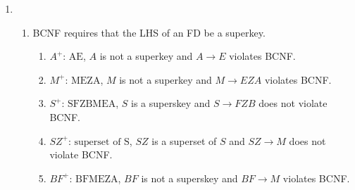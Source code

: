 \documentclass{csc_assignment2}
\begin{document}
\begin{description}
\begin{enumerate}
\item \begin{enumerate}
\item BCNF requires that the LHS of an FD be a superkey. \begin{enumerate}
\item $A^{+}$: $\text{AE}$, $A$ is not a superkey and $A \rightarrow E$ violates BCNF.
\item $M^{+}$: $\text{MEZA}$, $M$ is not a superkey and $M \rightarrow EZA$ violates BCNF. 
\item $S^{+}$: $\text{SFZBMEA}$, $S$ is a superskey and $S \rightarrow FZB$ does not violate BCNF. 
\item $SZ^{+}$: $\text{superset of S}$, $SZ$ is a superset of $S$ and $SZ \rightarrow M$ does not violate BCNF. 
\item $BF^{+}$: $\text{BFMEZA}$, $BF$ is not a superskey and $BF \rightarrow M$ violates BCNF.
\end{enumerate}


\end{enumerate}
\end{enumerate}
\end{description}
\end{document}
